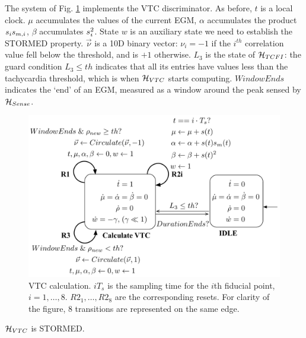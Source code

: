 The system of Fig. \ref{fig:HVTC} implements the VTC discriminator.
As before, $t$ is a local clock.
$\mu$ accumulates the values of the current \ac{EGM}, $\alpha$ accumulates the product $s_i s_{m,i}$, 
$\beta$ accumulates $s_i^2$.
State $w$ is an auxiliary state we need to establish the STORMED property.
$\vec{\nu}$ is a 10D binary vector: $\nu_i = -1$ if the $i^{th}$ correlation value fell below the threshold, and is $+1$ otherwise.
$L_3$ is the state of $\mathcal{H}_{TCFI}$: the guard condition $L_3 \leq th$ indicates that all its entries have values less than the tachycardia threshold, which is when $\mathcal{H}_{VTC}$ starts computing.
$WindowEnds$ indicates the `end' of an \ac{EGM}, measured as a window around the peak sensed by $\mathcal{H}_{Sense}$.  
%
\begin{figure}[t]
\centering
\includegraphics[scale=0.325]{figures/VTC1v2}
\vspace{-10pt}
\caption{VTC calculation. $iT_s$ is the sampling time for the $i${th} fiducial point, $i=1,\ldots,8$. $R2_{1},\ldots,R2_{8}$ are the corresponding resets. For clarity of the figure, 8 transitions are represented on the same edge.}
\vspace{-10pt}
\label{fig:HVTC}
\end{figure}
%
\begin{lemma}
	\label{lemma:vtc}
	$\mathcal{H}_{VTC}$ is STORMED.
	\end{lemma}
